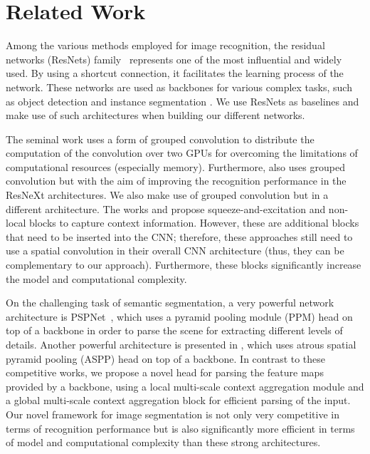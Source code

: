 \documentclass{article}
\begin{document}
\section{Related Work}
Among the various methods employed for image recognition, the residual networks (ResNets) family~\cite{he2016deep,he2016identity,xie2017aggregated} represents one of the most influential and widely used. By using a shortcut connection, it facilitates the learning process of the network. These networks are used as backbones for various complex tasks, such as object detection and  instance segmentation \cite{he2016deep,he2017mask,lin2017focal,lin2017feature,xie2017aggregated,hu2018squeeze,wu2018group}. We use ResNets as baselines and make use of such architectures when building our different networks.

The seminal work  \cite{krizhevsky2012imagenet} uses a form of grouped convolution to distribute the computation of the convolution over two GPUs for overcoming the limitations of computational resources (especially memory). Furthermore, also \cite{xie2017aggregated} uses  grouped convolution but with the aim of improving the recognition performance in the ResNeXt architectures. We also make use of grouped convolution but in a different architecture.  
The works \cite{hu2018squeeze} and \cite{wang2018non} propose  squeeze-and-excitation and non-local blocks to capture context information. However, these are additional blocks that need to be inserted into the CNN; therefore, these approaches still need to use a spatial convolution in their overall CNN architecture (thus, they can be complementary to our approach). Furthermore, these blocks significantly increase the model and computational complexity.

On the challenging task of semantic segmentation, a very powerful network architecture is PSPNet~\cite{zhao2017pyramid}, which uses a pyramid pooling module (PPM)  head on top of a backbone in order to parse the scene for extracting different levels of details. Another powerful architecture is presented in \cite{chen2017rethinking}, which uses atrous spatial pyramid pooling (ASPP) head on top of a backbone. In contrast to  these competitive works, we propose a novel head for parsing the feature maps provided by a backbone, using a local multi-scale context aggregation module and a global multi-scale context aggregation block for efficient parsing of the input.  Our novel framework for image segmentation is not only very competitive in terms of recognition performance but is also significantly more efficient in terms of model and computational complexity than these strong architectures. 
\end{document}
